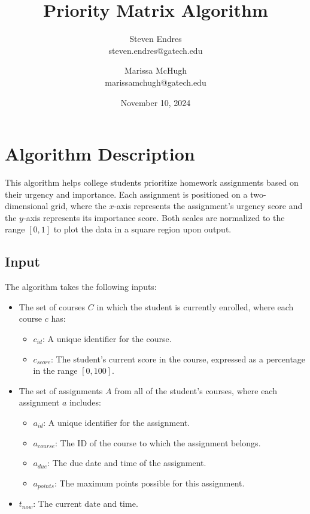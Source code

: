 \documentclass[letterpaper]{jdf}
\title{Priority Matrix Algorithm}
\author{
  Steven Endres\\
  steven.endres@gatech.edu
  \and
  Marissa McHugh\\
  marissamchugh@gatech.edu
}
\date{November 10, 2024}
\begin{document}
\maketitle

\section{Algorithm Description}

This algorithm helps college students prioritize homework assignments based on their urgency and importance. Each assignment is positioned on a two-dimensional grid, where the \(x\)-axis represents the assignment's urgency score and the \(y\)-axis represents its importance score. Both scales are normalized to the range \([0, 1]\) to plot the data in a square region upon output.

\subsection{Input}

The algorithm takes the following inputs:

\begin{itemize}
    \item The set of courses \( C \) in which the student is currently enrolled, where each course \( c \) has:
    \begin{itemize}
        \item \( c_{id} \): A unique identifier for the course.
        \item \( c_{score} \): The student's current score in the course, expressed as a percentage in the range \([0, 100]\).
    \end{itemize}
    \item The set of assignments \( A \) from all of the student's courses, where each assignment \( a \) includes:
    \begin{itemize}
        \item \( a_{id} \): A unique identifier for the assignment.
        \item \( a_{course} \): The ID of the course to which the assignment belongs.
        \item \( a_{due} \): The due date and time of the assignment.
        \item \( a_{points} \): The maximum points possible for this assignment.
    \end{itemize}
    \item \( t_{now} \): The current date and time.
\end{itemize}
\end{document}
